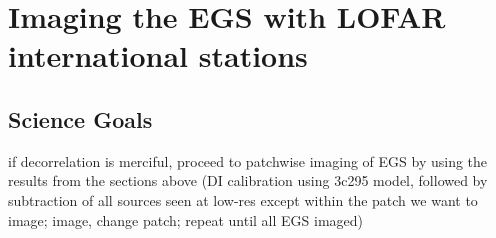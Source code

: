 \section{Imaging the EGS with LOFAR international stations}

\subsection{Science Goals}

\pg
if decorrelation is merciful, proceed to patchwise imaging of EGS by using the results from the sections above (DI calibration using 3c295 model, followed by subtraction of all sources seen at low-res except within the patch we want to image; image, change patch; repeat until all EGS imaged)

\newpage